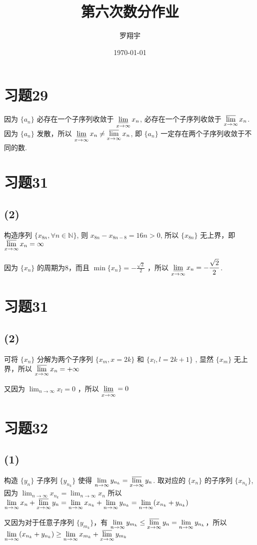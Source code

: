 \documentclass[a4paper,11pt]{article}
\title{第六次数分作业}
\author{罗翔宇}
\date{\today}
\newcommand{\Limit}{\displaystyle \lim_{n \rightarrow \infty}}
\newcommand{\uLimit}{\displaystyle \varlimsup_{x\rightarrow\infty}}
\newcommand{\dLimit}{\displaystyle \varliminf_{x\rightarrow\infty}}
\begin{document}
\maketitle

\section*{习题29}
因为 $\{a_n\}$ 必存在一个子序列收敛于 $\dLimit x_n$, 必存在一个子序列收敛于 $\uLimit x_n$. 因为 $\{a_n\}$ 发散，所以 $\dLimit x_n \not = \uLimit x_n$, 即 $\{a_n\}$ 一定存在两个子序列收敛于不同的数.
\section*{习题31}
\subsection*{(2)}
构造序列 $\{x_{8n}, \forall n \in \mathbb{N}\}$, 则 $x_{8n} - x_{8n-8} = 16n > 0$, 所以 $\{x_{8n}\}$ 无上界，即 $\uLimit x_n = \infty$

因为 $\{x_n\}$ 的周期为$8$，而且 $\min\{x_n\} = -\frac{\sqrt{2}}{2}$ ，所以 $\dLimit x_n = -\frac{\sqrt{2}}{2}$.
\section*{习题31}
\subsection*{(2)}
可将 $\{x_n\}$ 分解为两个子序列 $\{x_m, x = 2k\}$ 和 $\{x_l, l = 2k+1\}$ , 显然 $\{x_m\}$ 无上界，所以 $\uLimit x_n = +\infty$

又因为 $\Limit x_l = 0$ ，所以 $\dLimit = 0$
\section*{习题32}
\subsection*{(1)}
构造 $\{y_n\}$ 子序列 $\{y_{n_k}\}$ 使得 $\Limit y_{n_k} = \uLimit y_n$. 取对应的 $\{x_n\}$ 的子序列 $\{x_{n_k}\}$, 因为 $\Limit x_{n_k} = \Limit x_n$ 所以$\Limit x_n + \uLimit y_n = \Limit x_{n_k} + \Limit y_{n_k} = \Limit (x_{n_k} + y_{n_k})$

又因为对于任意子序列 $\{y_{m_k}\}$，有 $\Limit y_{m_k} \le \uLimit y_n = \Limit y_{n_k}$，所以 $\Limit (x_{n_k} + y_{n_k}) \ge \Limit x_{m_k} + \uLimit y_{m_k}$
\end{document}
